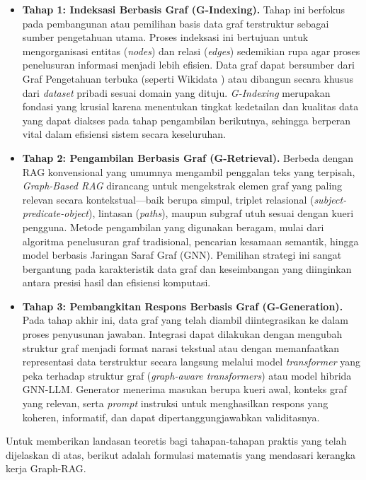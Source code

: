 \begin{itemize}
    \item \textbf{Tahap 1: Indeksasi Berbasis Graf (G-Indexing).}
    Tahap ini berfokus pada pembangunan atau pemilihan basis data graf terstruktur sebagai sumber pengetahuan utama. Proses indeksasi ini bertujuan untuk mengorganisasi entitas (\textit{nodes}) dan relasi (\textit{edges}) sedemikian rupa agar proses penelusuran informasi menjadi lebih efisien. Data graf dapat bersumber dari Graf Pengetahuan terbuka (seperti Wikidata \cite{wikidata}) atau dibangun secara khusus dari \textit{dataset} pribadi sesuai domain yang dituju. \textit{G-Indexing} merupakan fondasi yang krusial karena menentukan tingkat kedetailan dan kualitas data yang dapat diakses pada tahap pengambilan berikutnya, sehingga berperan vital dalam efisiensi sistem secara keseluruhan.
    
    \item \textbf{Tahap 2: Pengambilan Berbasis Graf (G-Retrieval).}
    Berbeda dengan RAG konvensional yang umumnya mengambil penggalan teks yang terpisah, \textit{Graph-Based RAG} dirancang untuk mengekstrak elemen graf yang paling relevan secara kontekstual---baik berupa simpul, triplet relasional (\textit{subject-predicate-object}), lintasan (\textit{paths}), maupun subgraf utuh sesuai dengan kueri pengguna. Metode pengambilan yang digunakan beragam, mulai dari algoritma penelusuran graf tradisional, pencarian kesamaan semantik, hingga model berbasis Jaringan Saraf Graf (GNN). Pemilihan strategi ini sangat bergantung pada karakteristik data graf dan keseimbangan yang diinginkan antara presisi hasil dan efisiensi komputasi.
    
    \item \textbf{Tahap 3: Pembangkitan Respons Berbasis Graf (G-Generation).}
    Pada tahap akhir ini, data graf yang telah diambil diintegrasikan ke dalam proses penyusunan jawaban. Integrasi dapat dilakukan dengan mengubah struktur graf menjadi format narasi tekstual atau dengan memanfaatkan representasi data terstruktur secara langsung melalui model \textit{transformer} yang peka terhadap struktur graf (\textit{graph-aware transformers}) atau model hibrida GNN-LLM. Generator menerima masukan berupa kueri awal, konteks graf yang relevan, serta \textit{prompt} instruksi untuk menghasilkan respons yang koheren, informatif, dan dapat dipertanggungjawabkan validitasnya.
\end{itemize}

Untuk memberikan landasan teoretis bagi tahapan-tahapan praktis yang telah dijelaskan di atas, berikut adalah formulasi matematis yang mendasari kerangka kerja Graph-RAG.

